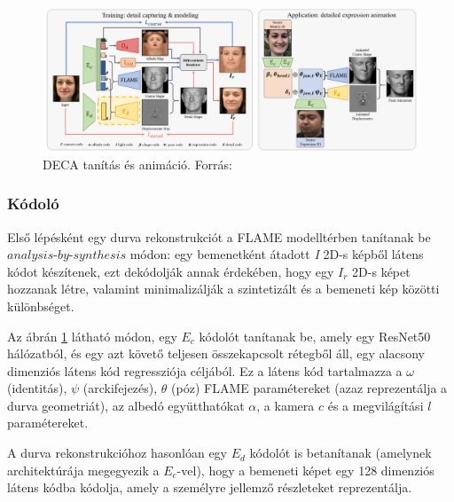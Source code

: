 \documentclass[12pt,a4]{article}
\begin{document}
            \begin{figure}[h]	
     		 \centering
     		 \includegraphics[width=1\linewidth]{deca}
     		 \caption{ DECA tanítás és animáció.
     			    Forrás:\cite{deca}}
                \label{fig:deca}
     	      \end{figure}

            \subsubsection{Kódoló} \label{Kódoló}
    	        Első lépésként egy durva rekonstrukciót a FLAME modelltérben \cite{flame}
                tanítanak be $analysis$-$by$-$synthesis$ módon: egy bemenetként átadott \textit{I} 2D-s képből látens kódot készítenek, ezt dekódolják annak érdekében, hogy egy $I_{r}$ 2D-s képet hozzanak létre, valamint minimalizálják a szintetizált és a bemeneti kép közötti különbséget.
            
    	        Az ábrán \ref{fig:deca} látható módon, egy $E_{c}$ kódolót tanítanak be, amely egy ResNet50 \cite{liwen} hálózatból, és egy azt követő teljesen összekapcsolt rétegből áll, egy alacsony dimenziós látens kód regressziója céljából. Ez a látens kód tartalmazza a $\omega$ (identitás), $\psi$ (arckifejezés), $\theta$ (póz) FLAME \cite{flame} paramétereket (azaz reprezentálja a durva geometriát), az albedó együtthatókat $\alpha$, a kamera $c$ és a megvilágítási $l$ paramétereket.
    
                A durva rekonstrukcióhoz hasonlóan egy $E_{d}$ kódolót is betanítanak (amelynek architektúrája megegyezik a $E_{c}$-vel), hogy a bemeneti képet egy 128 dimenziós látens kódba kódolja, amely a személyre jellemző részleteket reprezentálja. 
    
\end{document}

